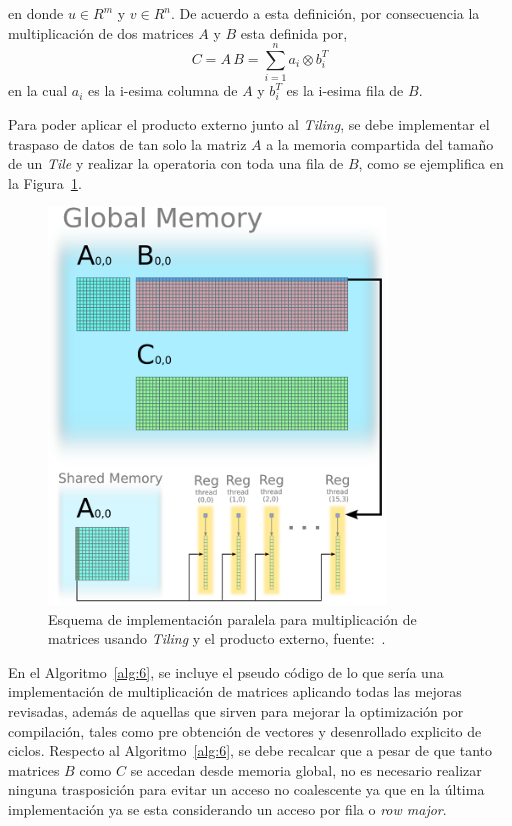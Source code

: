 en donde $u\in R^m$ y $v\in R^n$.
De acuerdo a esta definición, por consecuencia la multiplicación de dos matrices \(A\) y \(B\) esta definida por,
\begin{equation*}
    C = A\,B = \sum_{i=1}^n a_i \otimes b^T_i
\end{equation*}
en la cual \(a_i\) es la i-esima columna de \(A\) y $b_i^T$ es la i-esima fila de \(B\).

Para poder aplicar el producto externo junto al \textit{Tiling}, se debe implementar el traspaso de datos de tan solo la matriz \(A\) a la memoria compartida del tamaño de un \textit{Tile} y realizar la operatoria con toda una fila de \(B\), como se ejemplifica en la Figura~\ref{fig:13}.

\begin{figure}[h!]
\centering
\includegraphics[width=0.8\textwidth]{Figures/opt2.png}
\caption{Esquema de implementación paralela para multiplicación de matrices usando \textit{Tiling} y el producto externo, fuente:~\cite{matrixM}.}
\label{fig:13}
\end{figure}

En el Algoritmo~\ref{alg:6}, se incluye el pseudo código de lo que sería una implementación de multiplicación de matrices aplicando todas las mejoras revisadas, además de aquellas que sirven para mejorar la optimización por compilación, tales como pre obtención de vectores y desenrollado explicito de ciclos.
Respecto al Algoritmo~\ref{alg:6}, se debe recalcar que a pesar de que tanto matrices \(B\) como \(C\) se accedan desde memoria global, no es necesario realizar ninguna trasposición para evitar un acceso no coalescente ya que en la última implementación ya se esta considerando un acceso por fila o \textit{row major}.


